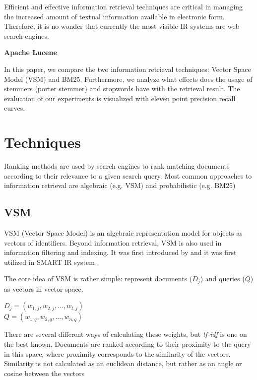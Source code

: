 Efficient and effective information retrieval techniques are critical in managing the increased amount of textual information available in electronic form. Therefore, it is no wonder that currently the most visible IR systems are web search engines.  

\textbf{Apache Lucene}

In this paper, we compare the two information retrieval techniques: Vector Space Model (VSM) and BM25. Furthermore, we analyze what effects does the usage of stemmers (porter stemmer) and stopwords have with the retrieval result. The evaluation of our experiments is visualized with eleven point precision recall curves. 


\section{Techniques}

Ranking methods are used by search engines to rank matching documents according to their relevance to a given search query. Most common approaches to information retrieval are algebraic (e.g. VSM) and probabilistic (e.g. BM25)

\subsection{VSM}

VSM (Vector Space Model) is an algebraic representation model for objects as vectors of identifiers. Beyond information retrieval, VSM is also used in information filtering and indexing. It was first introduced by \citep{ref1} and it was first utilized in SMART IR system \citep{ref2}.

The core idea of VSM is rather simple: represent documents ($D_j$) and queries ($Q$) as vectors in vector-space. 

\begin{center}
$ D_j = (w_{1,j}, w_{2,j},...,w_{t,j}) $ \\
$ Q = (w_{1,q}, w_{2,q},...,w_{n,q}) $
\end{center}

There are several different ways of calculating these weights, but \textit{tf-idf} is one on the best known. Documents are ranked according to their proximity to the query in this space, where proximity corresponds to the similarity of the vectors. Similarity is not calculated as an euclidean distance, but rather as an angle or cosine between the vectors

